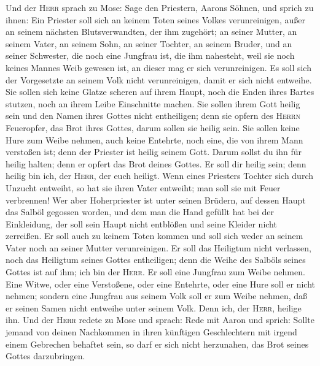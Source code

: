  Und der \textsc{Herr} sprach zu Mose: Sage den Priestern,
Aarons Söhnen, und sprich zu ihnen: Ein Priester soll sich an keinem
Toten seines Volkes verunreinigen,  außer an seinem
nächsten Blutsverwandten, der ihm zugehört; an seiner Mutter, an seinem
Vater, an seinem Sohn, an seiner Tochter, an seinem Bruder,
 und an seiner Schwester, die noch eine Jungfrau ist, die
ihm nahesteht, weil sie noch keines Mannes Weib gewesen ist, an dieser
mag er sich verunreinigen.  Es soll sich der Vorgesetzte
an seinem Volk nicht verunreinigen, damit er sich nicht entweihe.
 Sie sollen sich keine Glatze scheren auf ihrem Haupt,
noch die Enden ihres Bartes stutzen, noch an ihrem Leibe Einschnitte
machen.  Sie sollen ihrem Gott heilig sein und den Namen
ihres Gottes nicht entheiligen; denn sie opfern des \textsc{Herrn}
Feueropfer, das Brot ihres Gottes, darum sollen sie heilig sein.
 Sie sollen keine Hure zum Weibe nehmen, auch keine
Entehrte, noch eine, die von ihrem Mann verstoßen ist; denn der Priester
ist heilig seinem Gott.  Darum sollst du ihn für heilig
halten; denn er opfert das Brot deines Gottes. Er soll dir heilig sein;
denn heilig bin ich, der \textsc{Herr}, der euch heiligt. 
Wenn eines Priesters Tochter sich durch Unzucht entweiht, so hat sie
ihren Vater entweiht; man soll sie mit Feuer verbrennen! 
Wer aber Hoherpriester ist unter seinen Brüdern, auf dessen Haupt das
Salböl gegossen worden, und dem man die Hand gefüllt hat bei der
Einkleidung, der soll sein Haupt nicht entblößen und seine Kleider nicht
zerreißen.  Er soll auch zu keinem Toten kommen und soll
sich weder an seinem Vater noch an seiner Mutter verunreinigen.
 Er soll das Heiligtum nicht verlassen, noch das
Heiligtum seines Gottes entheiligen; denn die Weihe des Salböls seines
Gottes ist auf ihm; ich bin der \textsc{Herr}.  Er soll
eine Jungfrau zum Weibe nehmen.  Eine Witwe, oder eine
Verstoßene, oder eine Entehrte, oder eine Hure soll er nicht nehmen;
sondern eine Jungfrau aus seinem Volk soll er zum Weibe nehmen,
 daß er seinen Samen nicht entweihe unter seinem Volk.
Denn ich, der \textsc{Herr}, heilige ihn.  Und der
\textsc{Herr} redete zu Mose und sprach:  Rede mit Aaron
und sprich: Sollte jemand von deinen Nachkommen in ihren künftigen
Geschlechtern mit irgend einem Gebrechen behaftet sein, so darf er sich
nicht herzunahen, das Brot seines Gottes darzubringen. 
